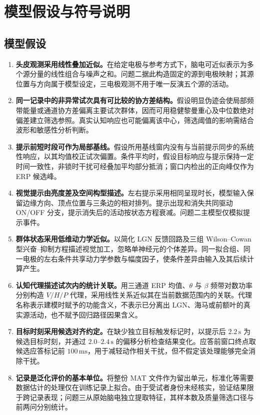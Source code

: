 
\section{模型假设与符号说明}

\subsection{模型假设}

\begin{enumerate}
  \item \textbf{头皮观测采用线性叠加近似。}在给定电极与参考方式下，脑电可近似表示为多个源分量的线性组合与噪声之和。问题二据此构造固定的源到电极映射；其源位置与方向属于模型设定，三电极观测不用于唯一反演五个源的活动。

  \item \textbf{同一记录中的非异常试次具有可比较的协方差结构。}假设明显伪迹会使局部频带能量或通道协方差偏离主要试次群体，因而可用稳健黎曼重心及中位数绝对偏差建立筛选参照。真实认知响应也可能偏离该中心，筛选阈值的影响需结合波形和敏感性分析判断。

  \item \textbf{提示前短时段可作为局部基线。}假设所用基线窗内没有与当前提示同步的系统性响应，以其均值校正试次偏置。条件平均时，假设目标响应与提示保持一定时间一致性，非锁时干扰可经叠加平均部分抵消；窗口内检出的正向峰仅作为 ERP 候选峰。

  \item \textbf{视觉提示由亮度差及空间构型描述。}左右提示采用相同呈现时长，模型输入保留边缘方向、顶点位置与三条边的相对排列。提示出现和消失共同驱动 ON/OFF 分支，提示消失后的活动按状态方程衰减。问题二主模型仅模拟提示事件。

  \item \textbf{群体状态采用低维动力学近似。}以简化 LGN 反馈回路及三组 Wilson--Cowan 型兴奋--抑制方程描述视觉加工，忽略单神经元的个体差异。同一拟合组、同一电极的左右条件共享动力学参数与幅度因子，使条件差异由输入及其后续计算产生。

  \item \textbf{认知代理描述试次内的统计关联。}用三通道 ERP 均值、\(\theta\) 与 \(\beta\) 频带对数功率分别构造 \(V/H/P\) 代理，采用线性关系近似其在当前数据范围内的关联。代理名称表示建模时赋予的功能含义，不表示已分离出 LGN、海马或前额叶的真实源活动，也不赋予回归路径因果含义。

  \item \textbf{目标时刻采用候选对齐约定。}在缺少独立目标触发标记时，以提示后 \(2.2\,\mathrm{s}\) 为候选目标时刻，并通过 \(2.0\)--\(2.4\,\mathrm{s}\) 的偏移分析检查结果变化。应答前窗口终点取候选应答标记前 \(100\,\mathrm{ms}\)，用于减轻动作相关干扰，但不假定该处理能够完全消除干扰。

  \item \textbf{记录是泛化评价的基本单位。}将整份 MAT 文件作为留出单元，标准化等需要数据估计的处理仅在训练记录上拟合。由于受试者身份未经核实，验证结果限于跨记录表现；问题三从原始脑电独立提取特征，其样本数及质量筛选口径与前两问分别统计。
\end{enumerate}

